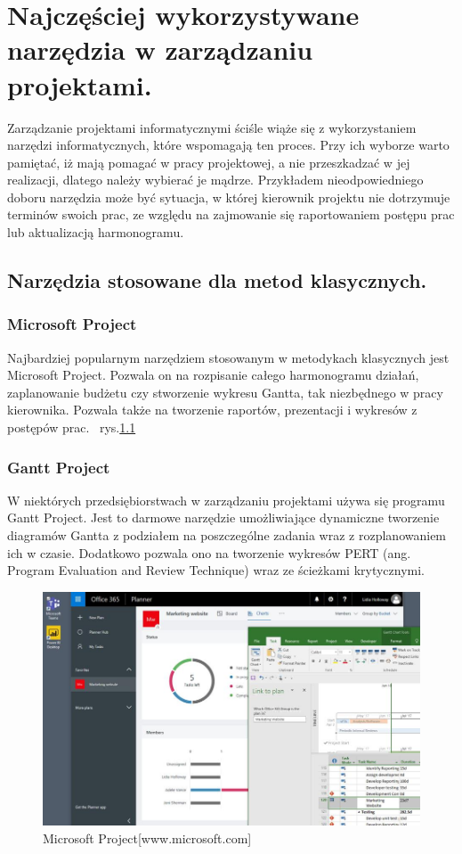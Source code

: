 
\chapter{Najczęściej wykorzystywane narzędzia w zarządzaniu projektami.}

Zarządzanie projektami informatycznymi ściśle wiąże się z wykorzystaniem narzędzi informatycznych,
które wspomagają ten proces. Przy ich wyborze warto pamiętać, iż mają pomagać w pracy projektowej,
a nie przeszkadzać w jej realizacji, dlatego należy wybierać je mądrze.
Przykładem nieodpowiedniego doboru narzędzia może być sytuacja,
w której kierownik projektu nie dotrzymuje terminów swoich prac,
ze względu na zajmowanie się raportowaniem postępu prac lub aktualizacją harmonogramu.\cite{Kopczewski_2015}

\section{Narzędzia stosowane dla metod klasycznych.}

\subsection{Microsoft Project}

Najbardziej popularnym narzędziem stosowanym w metodykach klasycznych jest Microsoft Project.
Pozwala on na rozpisanie całego harmonogramu działań, zaplanowanie budżetu czy stworzenie wykresu Gantta,
tak niezbędnego w pracy kierownika. Pozwala także na tworzenie raportów, prezentacji i wykresów z postępów prac.
~rys.\ref{rys:project}

\subsection{Gantt Project}

W niektórych przedsiębiorstwach w zarządzaniu projektami używa się programu Gantt Project.
Jest to darmowe narzędzie umożliwiające dynamiczne tworzenie diagramów Gantta z podziałem na poszczególne zadania wraz z rozplanowaniem ich w czasie.
Dodatkowo pozwala ono na tworzenie wykresów PERT (ang. Program Evaluation and Review Technique) wraz ze ścieżkami krytycznymi.\cite{Trendy_Zarzadzanie}

\begin{figure}
	\centering\includegraphics[width=.6\textwidth]{img/Microsoft_Project}
	\caption{Microsoft Project[www.microsoft.com]}\label{rys:project}%
\end{figure}

